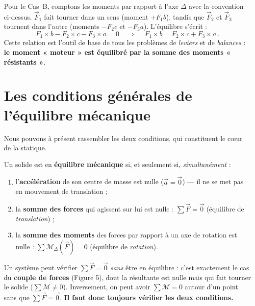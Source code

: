 \documentclass[11pt,a4paper]{article}
\newcommand{\vv}[1]{\vec{#1}}
\newcommand{\Mom}{\mathcal{M}}      %
\begin{document}
\begin{exemple}
Pour le Cas~B, comptons les moments par rapport à l'axe $\Delta$ avec la convention ci-dessus.
$\vv F_1$ fait tourner dans un sens (moment $+F_1 b$), tandis que $\vv F_2$ et $\vv F_3$ tournent
dans l'autre (moments $-F_2 c$ et $-F_3 a$). L'équilibre s'écrit :
\[
F_1\times b - F_2\times c - F_3\times a = 0
\quad\Longrightarrow\quad
\boxed{\,F_1\times b = F_2\times c + F_3\times a\,}.
\]
Cette relation est l'outil de base de tous les problèmes de \emph{leviers} et de \emph{balances} :
\textbf{le moment « moteur » est équilibré par la somme des moments « résistants »}.
\end{exemple}

\section{Les conditions générales de l'équilibre mécanique}
Nous pouvons à présent rassembler les deux conditions, qui constituent le cœur de la statique.

\begin{theoreme}
Un solide est en \textbf{équilibre mécanique} si, et seulement si, \emph{simultanément} :
\begin{enumerate}[leftmargin=1.8em,topsep=2pt,itemsep=2pt]
  \item l'\textbf{accélération} de son centre de masse est nulle ($\vv a = \vv 0$) — il ne se met pas en
        mouvement de translation ;
  \item la \textbf{somme des forces} qui agissent sur lui est nulle : $\displaystyle\sum \vv F = \vv 0$
        (équilibre de \emph{translation}) ;
  \item la \textbf{somme des moments} des forces par rapport à un axe de rotation est nulle :
        $\displaystyle\sum \Mom_{\Delta}(\vv F) = 0$ (équilibre de \emph{rotation}).
\end{enumerate}
\end{theoreme}

\begin{attention}
Un système peut vérifier $\sum\vv F = \vv 0$ \emph{sans} être en équilibre : c'est exactement le cas
du \textbf{couple de forces} (Figure 5), dont la résultante est nulle mais qui fait tourner le solide
($\sum\Mom \neq 0$). Inversement, on peut avoir $\sum\Mom = 0$ autour d'un point sans que
$\sum\vv F = \vv 0$. \textbf{Il faut donc toujours vérifier les deux conditions.}
\end{attention}
\end{document}
